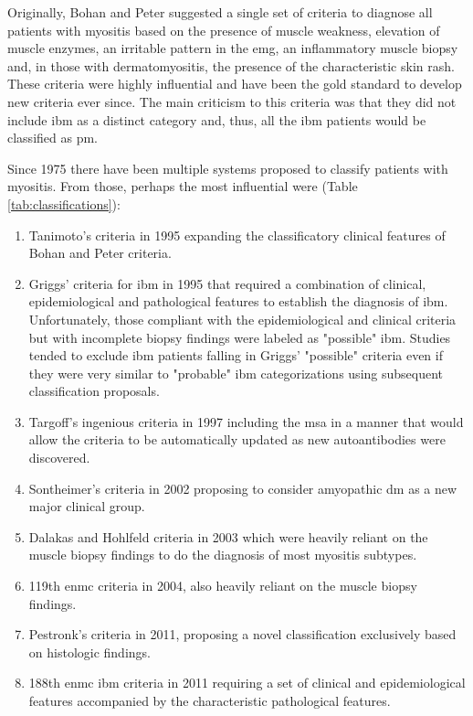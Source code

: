 Originally, Bohan and Peter suggested a single set of criteria to diagnose all patients with myositis based on the presence of muscle weakness, elevation of muscle enzymes, an irritable pattern in the \gls{emg}, an inflammatory muscle biopsy and, in those with dermatomyositis, the presence of the characteristic skin rash.\cite{Bohan1975} These criteria were highly influential and have been the gold standard to develop new criteria ever since. The main criticism to this criteria was that they did not include \gls{ibm} as a distinct category and, thus, all the \gls{ibm} patients would be classified as \gls{pm}.

Since 1975 there have been multiple systems proposed to classify patients with myositis. From those, perhaps the most influential were (Table \ref{tab:classifications}):

\begin{enumerate}
	\item Tanimoto's criteria in 1995\cite{Tanimoto1995} expanding the classificatory clinical features of Bohan and Peter criteria.
	
	\item Griggs' criteria for \gls{ibm} in 1995\cite{Griggs1995} that required a combination of clinical, epidemiological and pathological features to establish the diagnosis of \gls{ibm}. Unfortunately, those compliant with the epidemiological and clinical criteria but with incomplete biopsy findings were labeled as "possible" \gls{ibm}. Studies tended to exclude \gls{ibm} patients falling in Griggs' "possible" criteria even if they were very similar to "probable" \gls{ibm} categorizations using subsequent classification proposals.
	
	\item Targoff's ingenious criteria in 1997\cite{Targoff1997} including the \gls{msa} in a manner that would allow the criteria to be automatically updated as new autoantibodies were discovered.
	
	\item Sontheimer's criteria in 2002\cite{Sontheimer2002} proposing to consider amyopathic \gls{dm} as a new major clinical group.
	
	\item Dalakas and Hohlfeld criteria in 2003\cite{Dalakas2003} which were heavily reliant on the muscle biopsy findings to do the diagnosis of most myositis subtypes.
	
	\item 119th \gls{enmc} criteria in 2004,\cite{Hoogendijk2004} also heavily reliant on the muscle biopsy findings.
	
	\item Pestronk's criteria in 2011,\cite{Pestronk2011} proposing a novel classification exclusively based on histologic findings.
	
	\item 188th \gls{enmc} \gls{ibm} criteria in 2011\cite{Rose2013} requiring a set of clinical and epidemiological features accompanied by the characteristic pathological features.
\end{enumerate}

